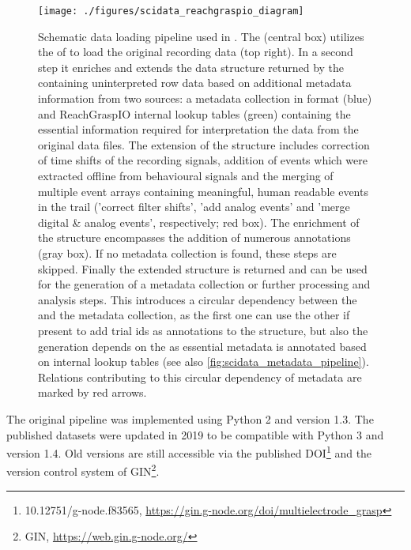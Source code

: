 \begin{figure}[hp]
 \texttt{[image: ./figures/scidata\_reachgraspio\_diagram]}
 \caption[Schematic data loading pipeline used in \citet{Brochier_2018}]{Schematic data loading pipeline used in \citet{Brochier_2018}. The  (central box) utilizes the  of  to load the original recording data (top right). In a second step it enriches and extends the data structure returned by the  containing uninterpreted row data based on additional metadata information from two sources: a metadata collection in  format (blue) and ReachGraspIO internal lookup tables (green) containing the essential information required for interpretation the data from the original data files. The extension of the  structure includes correction of time shifts of the recording signals, addition of events which were extracted offline from behavioural signals and the merging of multiple event arrays containing meaningful, human readable events in the trail ('correct filter shifts', 'add analog events' and 'merge digital \& analog events', respectively; red box). The enrichment of the  structure encompasses the addition of numerous annotations (gray box). If no metadata collection is found, these steps are skipped. Finally the extended  structure is returned and can be used for the generation of a metadata collection or further processing and analysis steps. This introduces a circular dependency between the  and the metadata collection, as the first one can use the other if present to add trial ids as annotations to the  structure, but also the  generation depends on the  as essential metadata is annotated based on internal lookup tables (see also \cref{fig:scidata_metadata_pipeline}). Relations contributing to this circular dependency of metadata are marked by red arrows.}
 \label{fig:scidata_reachgraspio_diagram}
\end{figure}

The original pipeline was implemented using Python 2 and  version 1.3. The published datasets were updated in 2019 to be compatible with Python 3 and  version 1.4. Old versions are still accessible via the published DOI\footnote{10.12751/g-node.f83565, \url{https://gin.g-node.org/doi/multielectrode_grasp}} and the version control system of GIN\footnote{GIN, \url{https://web.gin.g-node.org/}}.

